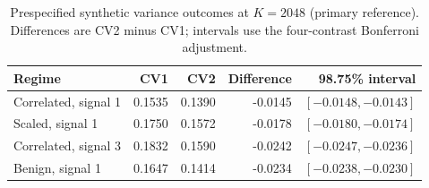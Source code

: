 \begin{table}[tb]
\centering\small
\caption{Prespecified synthetic variance outcomes at $K=2048$ (primary reference). Differences are CV2 minus CV1; intervals use the four-contrast Bonferroni adjustment.}\label{tab:p2_synthetic}
\begin{tabular}{lrrrr}
\toprule
Regime & CV1 & CV2 & Difference & 98.75\% interval \\
\midrule
Correlated, signal 1 & 0.1535 & 0.1390 & -0.0145 & $[-0.0148,-0.0143]$ \\
Scaled, signal 1 & 0.1750 & 0.1572 & -0.0178 & $[-0.0180,-0.0174]$ \\
Correlated, signal 3 & 0.1832 & 0.1590 & -0.0242 & $[-0.0247,-0.0236]$ \\
Benign, signal 1 & 0.1647 & 0.1414 & -0.0234 & $[-0.0238,-0.0230]$ \\
\bottomrule
\end{tabular}
\end{table}
